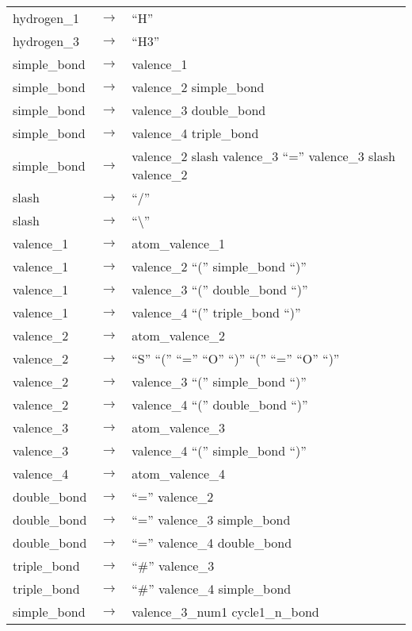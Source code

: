 \documentclass[../Document.tex]{subfiles}
\begin{document}
\begin{longtable}{m{} p{} p{}}
    hydrogen\_1 & $\rightarrow$ & ``H'' \\
    hydrogen\_3 & $\rightarrow$ & ``H3'' \\
    simple\_bond & $\rightarrow$ & valence\_1 \\
    simple\_bond & $\rightarrow$ & valence\_2 simple\_bond \\
    simple\_bond & $\rightarrow$ & valence\_3 double\_bond \\
    simple\_bond & $\rightarrow$ & valence\_4 triple\_bond \\
    simple\_bond & $\rightarrow$ & valence\_2 slash valence\_3 ``='' valence\_3 slash valence\_2 \\
    slash & $\rightarrow$ & ``/'' \\
    slash & $\rightarrow$ & ``\textbackslash'' \\
    valence\_1 & $\rightarrow$ & atom\_valence\_1 \\
    valence\_1 & $\rightarrow$ & valence\_2 ``('' simple\_bond ``)'' \\
    valence\_1 & $\rightarrow$ & valence\_3 ``('' double\_bond ``)'' \\
    valence\_1 & $\rightarrow$ & valence\_4 ``('' triple\_bond ``)'' \\
    valence\_2 & $\rightarrow$ & atom\_valence\_2 \\
    valence\_2 & $\rightarrow$ & ``S'' ``('' ``='' ``O'' ``)'' ``('' ``='' ``O'' ``)'' \\
    valence\_2 & $\rightarrow$ & valence\_3 ``('' simple\_bond ``)'' \\
    valence\_2 & $\rightarrow$ & valence\_4 ``('' double\_bond ``)'' \\
    valence\_3 & $\rightarrow$ & atom\_valence\_3 \\
    valence\_3 & $\rightarrow$ & valence\_4 ``('' simple\_bond ``)'' \\
    valence\_4 & $\rightarrow$ & atom\_valence\_4 \\
    double\_bond & $\rightarrow$ & ``='' valence\_2 \\
    double\_bond & $\rightarrow$ & ``='' valence\_3 simple\_bond \\
    double\_bond & $\rightarrow$ & ``='' valence\_4 double\_bond \\
    triple\_bond & $\rightarrow$ & ``\#'' valence\_3 \\
    triple\_bond & $\rightarrow$ & ``\#'' valence\_4 simple\_bond \\
    simple\_bond & $\rightarrow$ & valence\_3\_num1 cycle1\_n\_bond \\

\end{longtable}
\end{document}

